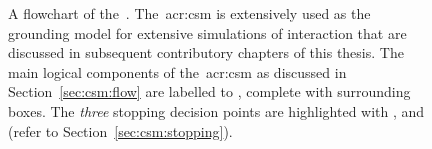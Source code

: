 \begin{figure}[t!]
    \centering
    \caption[Flowchart of the~\gls{acr:csm}]{A flowchart of the~. The~\gls{acr:csm} is extensively used as the grounding model for extensive simulations of interaction that are discussed in subsequent contributory chapters of this thesis. The main logical components of the~\gls{acr:csm} as discussed in Section~\ref{sec:csm:flow} are labelled  to , complete with surrounding boxes. The \emph{three} stopping decision points are highlighted with ,  and  (refer to Section~\ref{sec:csm:stopping}).}
    \label{fig:csm}
\end{figure}

